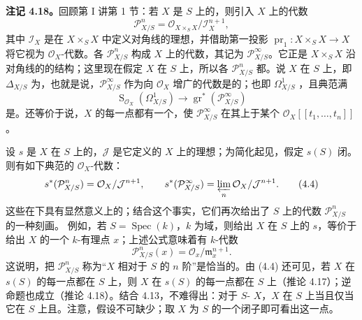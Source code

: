 \textbf{注记 4.18。}回顾第 I 讲第 1 节：若 $X$ 是 $S$ 上的，则引入 $X$ 上的代数
\[
\mathcal P^n_{X/S}=\mathcal O_{X\times_S X}/\mathcal I_X^{n+1},
\]
其中 $\mathcal I_X$ 是在 $X\times_S X$ 中定义对角线的理想，并借助第一投影 $\operatorname{pr}_1:X\times_S X\to X$ 将它视为 $\mathcal O_X$-代数。各 $\mathcal P^n_{X/S}$ 构成 $X$ 上的代数，其记为 $\mathcal P^\infty_{X/S}$。它正是 $X\times_S X$ 沿对角线的的结构；这里现在假定 $X$ 在 $S$ 上，所以各 $\mathcal P^n_{X/S}$ 都。说 $X$ 在 $S$ 上，即 $\Delta_{X/S}$ 为，也就是说，$\mathcal P^\infty_{X/S}$ 作为向 $\mathcal O_X$ 增广的代数是的；也即 $\Omega^1_{X/S}$ ，且典范满
\[
\operatorname{S}_{\mathcal O_X}(\Omega^1_{X/S})
\longrightarrow\operatorname{gr}^*(\mathcal P^\infty_{X/S})
\]
是。还等价于说，$X$ 的每一点都有一个，使 $\mathcal P^\infty_{X/S}$ 在其上于某个 $\mathcal O_X[[t_1,\ldots,t_n]]$。

设 $s$ 是 $X$ 在 $S$ 上的，$\mathcal J$ 是它定义的 $X$ 上的理想；为简化起见，假定 $s(S)$ 闭。则有如下典范的 $\mathcal O_X$-代数：
\[
s^*(\mathcal P^n_{X/S})=\mathcal O_X/\mathcal J^{n+1},\qquad
s^*(\mathcal P^\infty_{X/S})=\varprojlim_n\mathcal O_X/\mathcal J^{n+1}.\tag{4.4}
\]
这些在下具有显然意义上的；结合这个事实，它们再次给出了 $S$ 上的代数 $\mathcal P^n_{X/S}$ 的一种刻画。
例如，若 $S=\operatorname{Spec}(k)$，$k$ 为域，则给出 $X$ 在 $S$ 上的 $s$，等价于给出 $X$ 的一个 $k$-有理点 $x$；上述公式意味着有 $k$-代数
\[
\mathcal P^n_{X/S}(x)=\mathcal O_x/\mathfrak m_x^{n+1}.\tag{4.5}
\]
这说明，把 $\mathcal P^n_{X/S}$ 称为“$X$ 相对于 $S$ 的 $n$ 阶”是恰当的。由 (4.4) 还可见，若 $X$ 在 $s(S)$ 的每一点都在 $S$ 上，则 $X$ 在 $s(S)$ 的每一点都在 $S$ 上（推论 4.17）；逆命题也成立（推论 4.18）。结合 4.13，不难得出：对于 $S$- $X$，$X$ 在 $S$ 上当且仅当它在 $S$ 上且。注意，假设不可缺少；取 $X$ 为 $S$ 的一个闭子即可看出这一点。

